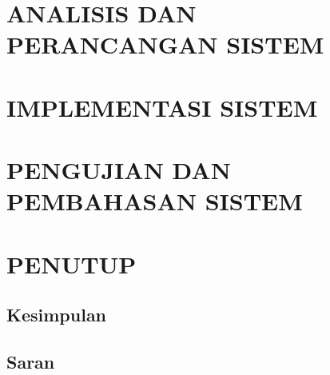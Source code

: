 \documentclass[ugmskripsi]{ugmskripsi}
\begin{document}
\chapter{ANALISIS DAN PERANCANGAN SISTEM}
\label{ANALISIS DAN PERANCANGAN SISTEM}




\chapter{IMPLEMENTASI SISTEM}
\label{IMPLEMENTASI SISTEM}





\chapter{PENGUJIAN DAN PEMBAHASAN SISTEM}
\label{PENGUJIAN DAN PEMBAHASAN SISTEM}



\chapter{PENUTUP}
\label{PENUTUP}

	\section{Kesimpulan}
	\label{penutup kesimpulan}
	

	\section{Saran}
	\label{penutup saran}
	
\end{document}
